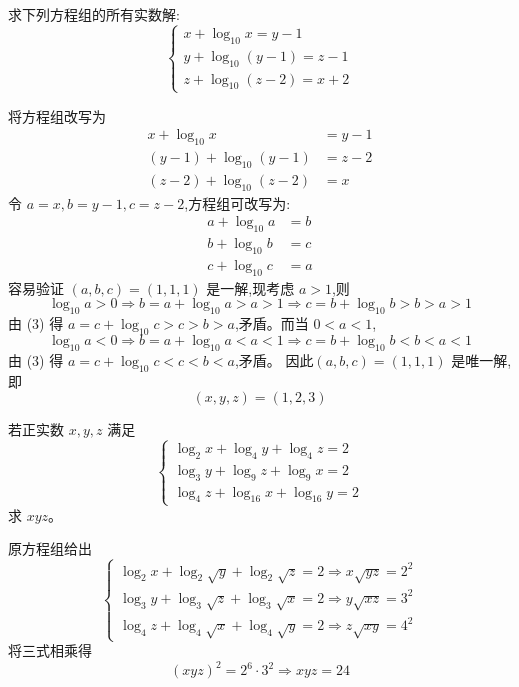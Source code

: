 \begin{questions}
    \question 求下列方程组的所有实数解:
    \[
    \begin{cases}
    x + \log_{10} x = y-1 \\
    y + \log_{10}(y-1) = z-1 \\
    z + \log_{10}(z-2) = x+2
    \end{cases}
    \]
    \begin{solution}
        将方程组改写为
        \begin{align*}
        x + \log_{10} x &= y-1 \\
        (y-1) + \log_{10}(y-1) &= z-2 \\
        (z-2) + \log_{10}(z-2) &= x
        \end{align*}
        令 $a = x,b = y-1,c = z-2$,方程组可改写为:
        \begin{align}
        a + \log_{10} a &= b \tag{1} \\
        b + \log_{10} b &= c \tag{2} \\
        c + \log_{10} c &= a \tag{3}
        \end{align}
        容易验证 $(a,b,c)=(1,1,1)$ 是一解,现考虑 $a>1$,则
        \[
        \log_{10} a > 0 \Rightarrow b = a+\log_{10}a > a > 1 \Rightarrow c = b+\log_{10}b > b > a > 1
        \]
        由 (3) 得 $a = c + \log_{10}c > c > b > a$,矛盾。而当 $0<a<1$,
        \[
        \log_{10} a < 0 \Rightarrow b = a+\log_{10}a < a < 1 \Rightarrow c = b+\log_{10}b < b < a < 1
        \]
        由 (3) 得 $a = c + \log_{10}c < c < b < a$,矛盾。
        因此$(a,b,c)=(1,1,1)$ 是唯一解,即 
        \[
        (x,y,z)=(1,2,3)
        \]
    \end{solution}

    \question 若正实数 $x,y,z$ 满足
    \[
    \begin{cases}
    \log_{2}x + \log_{4}y + \log_{4}z = 2 \\
    \log_{3}y + \log_{9}z + \log_{9}x = 2 \\
    \log_{4}z + \log_{16}x + \log_{16}y = 2
    \end{cases}
    \]
    求 $xyz$。
    \begin{solution}
        原方程组给出
        \[
        \begin{cases}
        \log_2 x + \log_2 \sqrt{y} + \log_2 \sqrt{z} = 2 \Rightarrow x\sqrt{yz} = 2^2 \\
        \log_3 y + \log_3 \sqrt{z} + \log_3 \sqrt{x} = 2 \Rightarrow y\sqrt{xz} = 3^2 \\
        \log_4 z + \log_4 \sqrt{x} + \log_4 \sqrt{y} = 2
        \Rightarrow z\sqrt{xy} = 4^2
        \end{cases}
        \]
        将三式相乘得
        \[
        (xyz)^2 = 2^6 \cdot 3^2 \Rightarrow xyz = 24
        \]
    \end{solution}


\end{questions}
